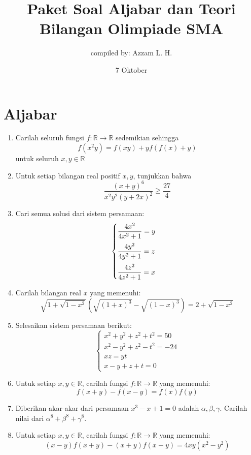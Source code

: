 \documentclass[12pt]{article}
\title{Paket Soal Aljabar dan Teori Bilangan Olimpiade SMA}
\author{compiled by: Azzam L. H.}
\date{7 Oktober}
\newcommand{\R}{\mathbb{R}}
\begin{document}
	
	\maketitle
	
	\section{Aljabar}
	\begin{enumerate}
		\item
		Carilah seluruh fungsi $f:\R \rightarrow \R$ sedemikian sehingga
		\[
		f(x^2y)=f(xy)+yf(f(x)+y)
		\]
		untuk seluruh $x,y \in \R$
		
		\item
		Untuk setiap bilangan real positif $x,y$, tunjukkan bahwa $$\frac{(x+y)^6}{x^2y^2(y+2x)^2} \geq \frac{27}{4}$$
		
		\item
		Cari semua solusi dari sistem persamaan:
		$$
		\begin{cases}
			\vspace{2mm}
			\dfrac{4x^2}{4x^2+1}=y \\
			\vspace{2mm}
			\dfrac{4y^2}{4y^2+1}=z \\
			\dfrac{4z^2}{4z^2+1}=x
		\end{cases}
		$$
		
		\item
		Carilah bilangan real $x$ yang memenuhi:
		\[
		\sqrt{1+\sqrt{1-x^2}}\left(\sqrt{(1+x)^3}-\sqrt{(1-x)^3}\right)=2+\sqrt{1-x^2}
		\]
		
		\item
		Selesaikan sistem persamaan berikut:
		$$
		\begin{cases}
			x^2+y^2+z^2+t^2=50 \\
			x^2-y^2+z^2-t^2=-24 \\
			xz = yt \\
			x-y+z+t=0
		\end{cases}
		$$
		
		\item
		Untuk setiap $x,y \in \R$, carilah fungsi $f: \R \rightarrow  \R$ yang memenuhi:
		$$f(x+y)-f(x-y)=f(x)f(y)$$
		
		\item
		Diberikan akar-akar dari persamaan $x^3-x+1=0$ adalah $\alpha, \beta, \gamma$. Carilah nilai dari $\alpha^8+\beta^8+\gamma^8$.
		
		\item
		Untuk setiap $x,y \in \R$, carilah fungsi $f: \R \rightarrow  \R$ yang memenuhi:
		$$(x-y)f(x+y)-(x+y)f(x-y) = 4xy(x^2-y^2)$$
		

\end{enumerate}
\end{document}

